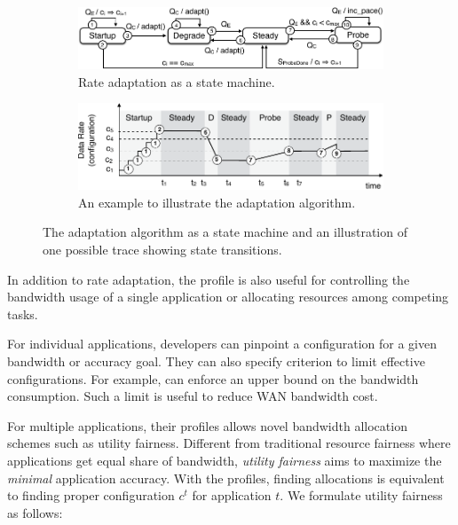 \begin{figure}
  \begin{subfigure}[t]{\columnwidth}
    \centering
    \includegraphics[width=\columnwidth]{figures/cc.pdf}
    \caption{Rate adaptation as a state machine.}
    \vspace{1em}
    \label{fig:cc-sm}
  \end{subfigure}
  \begin{subfigure}[t]{\columnwidth}
    \centering
    \includegraphics[width=\columnwidth]{figures/cc2.pdf}
    \caption{An example to illustrate the adaptation algorithm.}
    \label{fig:cc-ex}
  \end{subfigure}

  \caption{The adaptation algorithm as a state machine and an illustration of
    one possible trace showing state transitions.}
  \label{fig:cc}
\end{figure}

%     

 In addition to rate adaptation, the
profile is also useful for controlling the bandwidth usage of a single
application or allocating resources among competing tasks.

For individual applications, developers can pinpoint a configuration for a given
bandwidth or accuracy goal. They can also specify criterion to limit effective
configurations. For example, \sysname{} can enforce an upper bound on the
bandwidth consumption. Such a limit is useful to reduce WAN bandwidth cost.

For multiple applications, their profiles allows novel bandwidth allocation
schemes such as utility fairness. Different from traditional resource fairness
where applications get equal share of bandwidth, \textit{utility fairness} aims
to maximize the \textit{minimal} application accuracy. With the profiles,
finding allocations is equivalent to finding proper configuration $c^t$ for
application $t$. We formulate utility fairness as follows:

